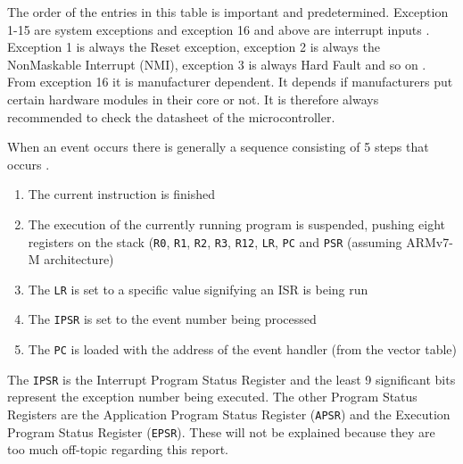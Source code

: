 The order of the entries in this table is important and predetermined.
Exception 1-15 are system exceptions and exception 16 and above are interrupt inputs \cite{DefinitiveGuide}.
Exception 1 is always the Reset exception, exception 2 is always the NonMaskable Interrupt (NMI), exception 3 is always Hard Fault and so on \cite{DefinitiveGuide}.
From exception 16 it is manufacturer dependent. 
It depends if manufacturers put certain hardware modules in their core or not.
It is therefore always recommended to check the datasheet of the microcontroller.

\newpage
When an event occurs there is generally a sequence consisting of 5 steps that occurs \cite{IntroEmbeddedSystems}.
\begin{enumerate}
    \item {The current instruction is finished}
    \item {The execution of the currently running program is suspended, pushing eight registers on the stack (\texttt{R0}, \texttt{R1}, \texttt{R2}, \texttt{R3}, \texttt{R12}, \texttt{LR}, \texttt{PC} and \texttt{PSR} (assuming ARMv7-M architecture)}
    \item {The \texttt{LR} is set to a specific value signifying an ISR is being run}
    \item {The \texttt{IPSR} is set to the event number being processed}
    \item {The \texttt{PC} is loaded with the address of the event handler (from the vector table)}
\end{enumerate}

The \texttt{IPSR} is the Interrupt Program Status Register and the least 9 significant bits represent the exception number being executed.
The other Program Status Registers are the Application Program Status Register (\texttt{APSR}) and the Execution Program Status Register (\texttt{EPSR}).
These will not be explained because they are too much off-topic regarding this report.
